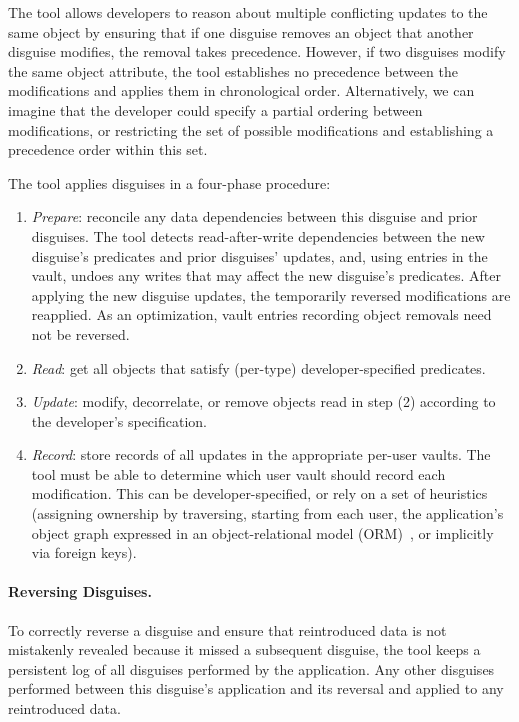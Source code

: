 The tool allows developers to reason about multiple conflicting updates to the same object by ensuring that
if one disguise removes an object that another disguise modifies, the removal takes
precedence.
%
However, if two disguises modify the same object attribute, the tool
establishes no precedence between the modifications and applies them in chronological order.
Alternatively, we can imagine that the developer could specify a partial ordering between
modifications, or restricting the set of possible modifications and establishing a precedence order
within this set.

The tool applies disguises in a four-phase procedure:
\begin{enumerate}
    \item \emph{Prepare}: reconcile any data dependencies between this disguise and prior disguises.
            The tool detects read-after-write dependencies between the new disguise's predicates and prior disguises'
            updates, and, using entries in the vault, undoes any writes that may affect the new disguise's predicates. After
            applying the new disguise updates, the temporarily reversed modifications are reapplied. As an
            optimization, vault entries recording object removals need not be reversed.
        \item \emph{Read}: get all objects that satisfy (per-type) developer-specified predicates.
        \item \emph{Update}: modify, decorrelate, or remove objects read in step (2) according to the
        developer's specification.
    \item \emph{Record}: store records of all updates in the appropriate per-user vaults. The tool
        must be able to determine which user vault should record each modification. This can be
        developer-specified, or rely on a set of heuristics (\eg assigning ownership by traversing,
        starting from each user, the application's object graph expressed in an object-relational
        model (ORM)~\cite{orm}, or implicitly via foreign keys).

\end{enumerate}

\paragraph{Reversing Disguises.}
To correctly reverse a disguise and ensure that reintroduced data is not mistakenly revealed because
it missed a subsequent disguise, the tool keeps a persistent log of all disguises performed by the
application. Any other disguises performed between this disguise's application and its reversal and
applied to any reintroduced data.
